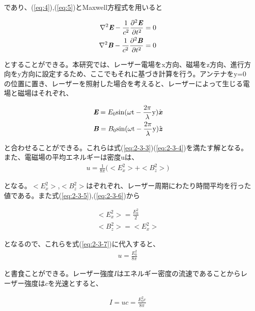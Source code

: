 \documentclass[a4paper,11pt,titlepage]{jarticle}
\numberwithin{equation}{section} %
\begin{document}
  であり、(\ref{eq:4}),(\ref{eq:5})とMaxwell方程式を用いると
  
  \begin{eqnarray}
    \label{eq:2-3-3}
    \nabla ^{2} \textit{\textbf{E}} - \frac{1}{c^2} \frac{\partial ^{2} \textit{\textbf{E}}}{\partial t^2} = 0\\
    \label{eq:2-3-4}
    \nabla ^2 \textit{\textbf{B}} - \frac{1}{c^2} \frac{\partial ^2 \textit{\textbf{B}}}{\partial t^2}=0  
  \end{eqnarray}
  
  とすることができる。本研究では、レーザー電場をx方向、磁場をz方向、進行方向をy方向に設定するため、ここでもそれに基づき計算を行う。アンテナをy=0の位置に置き、レーザーを照射した場合を考えると、レーザーによって生じる電場と磁場はそれぞれ、
  
  \begin{eqnarray}
    \label{eq:2-3-5}
    \textit{\textbf{E}}=E_0 \rm{sin} \lparen \omega t -\frac{2\pi}{\lambda} y \rparen \hat{\textit{\textbf{x}}}\\
    \label{eq:2-3-6}
    \textit{\textbf{B}}=B_0 \rm{sin} \lparen \omega t -\frac{2\pi}{\lambda} y \rparen \hat{\textit{\textbf{z}}}
  \end{eqnarray}
  
  と合わせることができる。これらは式(\ref{eq:2-3-3})(\ref{eq:2-3-4})を満たす解となる。
  また、電磁場の平均エネルギーは密度uは、
  \begin{eqnarray}
    \label{eq:2-3-7}
    u = \frac{1}{8 \pi} \lparen <E_x^2>  + <B_z^2> \rparen
  \end{eqnarray}
  
  となる。$<E_x^2>$,$<B_z^2>$はぞれぞれ、レーザー周期にわたり時間平均を行った値である。また式(\ref{eq:2-3-5}),(\ref*{eq:2-3-6})から
  
  \begin{eqnarray}
    <E_x^2>= \frac{E_0^2}{2}\\
    <B_z^2>=<E_x^2>
  \end{eqnarray}
  
  となるので、これらを式(\ref*{eq:2-3-7})に代入すると、
  \begin{eqnarray}
    u= \frac{E_0^2}{8 \pi}
  \end{eqnarray}
  
  と書食ことができる。レーザー強度$I$はエネルギー密度の流速であることからレーザー強度は$c$を光速とすると、
  
  \begin{eqnarray}
    I=uc= \frac{E_0^2 c}{8 \pi}
  \end{eqnarray}
  
\end{document}
